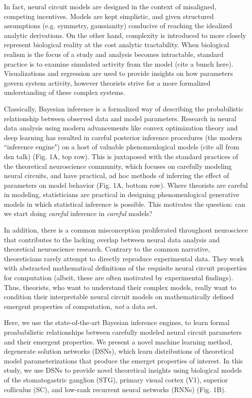 \documentclass[11pt]{article}
\begin{document}
In fact, neural circuit models are designed in the context of misaligned, competing incentives.  Models are kept simplistic, and given structured assumptions (e.g. symmetry, gaussianity) conducive of reaching the idealized analytic derivations.  On the other hand, complexity is introduced to more closely represent biological reality at the cost analytic tractability.  When biological realism is the focus of a study and analysis becomes intractable, standard practice is to examine simulated activity from the model \cite{gutierrez2013multiple} (cite a bunch here).  Visualizations and regression are used to provide insights on how parameters govern system activity, however theorists strive for a more formalized understanding of these complex systems.

Classically, Bayesian inference is a formalized way of describing the probabilistic relationship between observed data and model parameters.  Research in neural data analysis using modern advancements like convex optimization theory and deep learning has resulted in careful posterior inference procedures (the modern ``inference engine") on a host of valuable phenomenlogical models (cite all from dsn talk) (Fig. 1A, top row).  This is juxtaposed with the standard practices of the theoretical neuroscience community, which focuses on carefully modeling neural circuits, and have  practical, ad hoc methods of inferring the effect of parameters on model behavior (Fig. 1A, bottom row).  Where theorists are careful in modeling, statisticians are practical in designing phenomenlogical generative models in which statistical inference is possible.  This motivates the question: can we start doing \textit{careful} inference in \textit{careful} models?

In addition, there is a common misconception proliferated throughout neurosciece that contributes to the lacking overlap between neural data analysis and theoretical neuroscience research.  Contrary to the common narrative, theoreticians rarely attempt to directly reproduce experimental data.  They work with abstracted mathematical definitions of the requisite neural circuit properties for computation (albeit, these are often motivated by experimental findings).  Thus, theorists, who want to understand their complex models, really want to condition their interpretable neural circuit models on mathematically defined emergent properties of computation, \textit{not} a data set.  

Here, we use the state-of-the-art Bayesian inference engines, to learn formal proababilistic relationships between carefully modeled neural circuit parameters and their emergent properties.   We present a novel machine learning method, degenerate solution networks (DSNs), which learn distributions of theoretical model parameterizations that produce the emerget properties of interest.  In this study, we use DSNs to provide novel theoretical insights using biological models of the stomatogastric ganglion (STG), primary visual cortex (V1), superior colliculus (SC), and low-rank recurrent neural networks (RNNs) (Fig. 1B).
\end{document}

